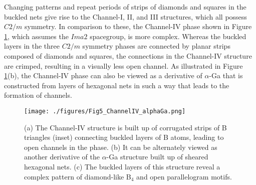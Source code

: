 \documentclass[reprint,aps,prl,twocolumn,letterpaper]{revtex4-2}
\newlength{\figurewidth}
\begin{document}
Changing patterns and repeat periods of strips of diamonds and squares in the buckled nets give rise to the Channel-I, II, and III structures, which all possess $C2/m$ symmetry. In comparison to these, the Channel-IV phase shown in Figure \ref{fig:Fig5_ChannelIV_alphaGa.png}, which assumes the $Ima2$ spacegroup, is more complex. Whereas the buckled layers in the three $C2/m$ symmetry phases are connected by planar strips composed of diamonds and squares, the connections in the Channel-IV structure are crimped,  resulting in a visually less open channel. As illustrated in Figure \ref{fig:Fig5_ChannelIV_alphaGa.png}(b), the Channel-IV phase can also be viewed as a derivative of $\alpha$-Ga that is constructed from layers of hexagonal nets in such a way that leads to the formation of channels.

\begin{figure}
\begin{center}
\texttt{[image: ./figures/Fig5\_ChannelIV\_alphaGa.png]}
\end{center}
\caption{(a) The Channel-IV structure is built up of corrugated strips of B triangles (inset) connecting buckled layers of B atoms, leading to open channels in the phase. (b) It can be alternately viewed as another derivative of the $\alpha$-Ga structure built up of sheared hexagonal nets. (c) The buckled layers of this structure reveal a complex pattern of diamond-like B$_{4}$ and open parallelogram motifs. 
\label{fig:Fig5_ChannelIV_alphaGa.png}}
\end{figure}
\end{document}
